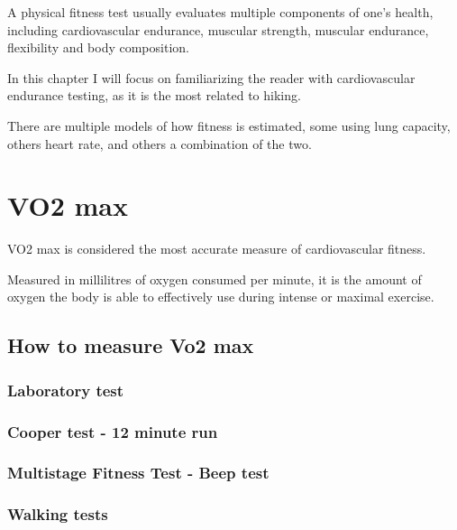 A physical fitness test usually evaluates multiple components of one's health, including cardiovascular endurance, muscular strength, muscular endurance, flexibility and body composition.

In this chapter I will focus on familiarizing the reader with cardiovascular endurance testing, as it is the most related to hiking.

There are multiple models of how fitness is estimated, some using lung capacity, others heart rate, and others a combination of the two.

\section{VO2 max}
VO2 max is considered the most accurate measure of cardiovascular fitness.

Measured in millilitres of oxygen consumed per minute, it is the amount of oxygen the body is able to effectively use during intense or maximal exercise.\cite{vo2max-definition}

\subsection{How to measure Vo2 max}

\subsubsection*{Laboratory test}
\subsubsection*{Cooper test - 12 minute run}
\subsubsection*{Multistage Fitness Test - Beep test}
\subsubsection*{Walking tests}